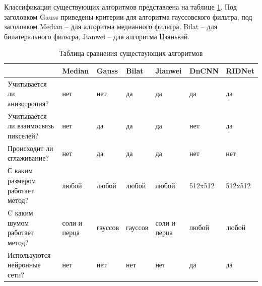 Классификация существующих алгоритмов представлена на таблице \ref{table::class}.
Под заголовком Gauss приведены критерии для алгоритма гауссовского фильтра, под заголовком Median -- для алгоритма медианного фильтра, Bilat -- для билатерального фильтра, Jianwei -- для алгоритма Цзяньвэй.
\FloatBarrier
\begin{table}[h]
	\caption{Таблица сравнения существующих алгоритмов}
	\captionsetup{justification=raggedleft}
	\centering
	\begin{tabular}{ | p{4cm} | p{1.6cm} | p{1.7cm} | p{1.7cm} | p{1.5cm} | p{1.7cm}| p{1.7cm} |}
		\hline
		 			 & Median  & Gauss & Bilat & Jianwei & DnCNN &  RIDNet \\ 
		\hline
		Учитывается ли
		анизотропия?     & нет          & нет	  	 &  да        &	да & да & да \\
		\hline
		Учитывается ли взаимосвязь пикселей?   & нет  & да  	 &  да	   &	да		& нет & да \\
		\hline
		Происходит ли сглаживание? & нет 	& да & да & да & нет &  нет	   \\
		\hline
		С каким размером работает метод?  & любой 	& любой & любой & любой	& 512x512 & 512x512 \\
		\hline
		C каким шумом работает метод?  & соли и перца & гауссов &  гауссов	& соли и перца & любой & любой \\
		\hline
		Используются нейронные сети?  & нет 	& нет 		 &  нет	   &	нет		& да & да \\
		\hline
	\end{tabular}
\label{table::class}
\end{table}